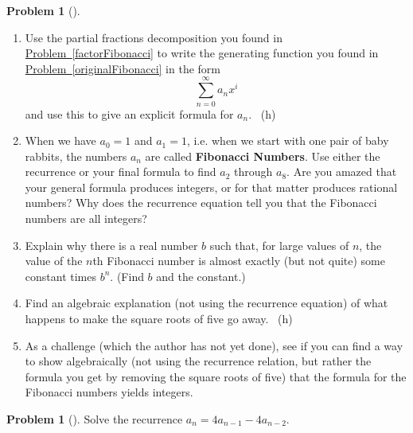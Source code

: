 \documentclass[10pt,]{book}
\newcommand{\terminology}[1]{\textbf{#1}}
\theoremstyle{plain}
\theoremstyle{definition}
\newtheorem{activity}[project]{Problem}
\theoremstyle{definition}
\numberwithin{equation}{chapter}
\begin{document}
\begin{activity}[] \label{solveFibonacci}
\leavevmode%
\begin{enumerate}[font=\bfseries,label=(\alph*),ref=\alph*]
\item\label{task-160} \marginsymbol[-2.5em]{} \hypertarget{p-1261}{}%
Use the partial fractions decomposition you found in \hyperref[factorFibonacci]{Problem~\ref{factorFibonacci}} to write the generating function you found in \hyperref[originalFibonacci]{Problem~\ref{originalFibonacci}} in the form%
\begin{equation*}
\sum_{n=0}^\infty a_nx^i
\end{equation*}
and use this to give an explicit formula for \(a_n\).%
~{\tiny (h)}\item\label{task-161} \marginsymbol[-2.5em]{} \hypertarget{p-1264}{}%
When we have \(a_0=1\) and \(a_1=1\), i.e. when we start with one pair of baby rabbits, the numbers \(a_n\) are called \terminology{Fibonacci Numbers}.  Use either the recurrence or your final formula to find \(a_2\) through \(a_8\).  Are you amazed that your general formula produces integers, or for that matter produces rational numbers?  Why does the recurrence equation tell you that the Fibonacci numbers are all integers?%
\item\label{task-162} \marginsymbol[-2.5em]{} \hypertarget{p-1266}{}%
Explain why there is a real number \(b\) such that, for large values of \(n\), the value of the \(n\)th Fibonacci number is almost exactly (but not quite) some constant times \(b^n\). (Find \(b\) and the constant.)%
\item\label{task-163} \marginsymbol[-2.5em]{} \hypertarget{p-1268}{}%
Find an algebraic explanation (not using the recurrence equation) of what happens to make the square roots of five go away.%
~{\tiny (h)}\item\label{task-164} \marginsymbol[-2.5em]{} \hypertarget{p-1271}{}%
As a challenge (which the author has not yet done), see if you can find a way to show algebraically (not using the recurrence relation, but rather the formula you get by removing the square roots of five) that the formula for the Fibonacci numbers yields integers.%
\end{enumerate}
\end{activity}
\begin{activity}[]\marginsymbol[-1em]{} \label{activity-223}
\hypertarget{p-1273}{}%
Solve the recurrence \(a_n= 4a_{n-1} - 4a_{n-2}\).%
\end{activity}
\typeout{************************************************}
\typeout{************************************************}
\end{document}
